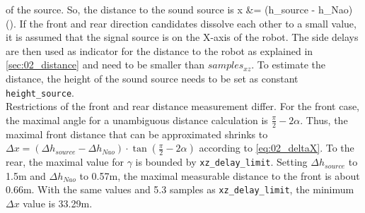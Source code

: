 of the source.
So, the distance to the sound source is
\bal
\Delta x &= (\Delta h_{source} - \Delta h_{Nao}) \cdot \tan(\gamma).
\label{eq:02_deltaX}
\eal
If the front and rear direction candidates dissolve each other to a small
value, it is assumed that the signal source is on the X-axis of the robot.
The side delays are then used as indicator for the distance to the robot as
explained in \cref{sec:02_distance} and need to be smaller than
 $samples_{xz}$.
To estimate the distance, the height of the sound source needs to be set as
constant  \lstinline!height_source!.\\
Restrictions of the front and rear distance measurement differ.
For the front case, the maximal angle for a unambiguous distance calculation
is $\frac{\pi}{2}- 2\alpha$.
Thus, the maximal front distance that can be approximated shrinks to
$\Delta x = (\Delta h_{source} - \Delta h_{Nao}) \cdot \tan(\frac{\pi}{2} - 2\alpha)$
according to \cref{eq:02_deltaX}.
To the rear, the maximal value for $\gamma$ is bounded by 
\lstinline!xz_delay_limit!.
Setting $\Delta h_{source}$ to 1.5\si{m} and $\Delta h_{Nao}$ to 0.57\si{m},
the maximal measurable distance to the front is about 0.66\si{m}.
With the same values and 5.3 samples as \lstinline!xz_delay_limit!, the
minimum $\Delta x$ value is 33.29\si{m}.

